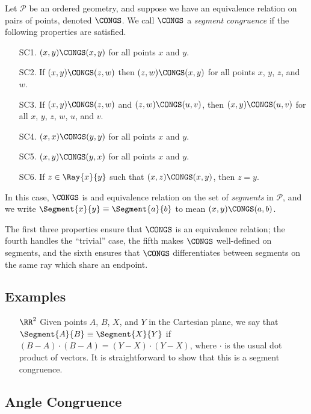\documentclass{article}
\begin{document}

\begin{dfn}
Let $\mathcal{P}$ be an ordered geometry, and suppose we have an equivalence relation on pairs of points, denoted $\CONGS$. We call $\CONGS$ a \emph{segment congruence} if the following properties are satisfied.
\begin{itemize}
\item[SC1.] $(x,y) \CONGS (x,y)$ for all points $x$ and $y$.
\item[SC2.] If $(x,y) \CONGS (z,w)$ then $(z,w) \CONGS (x,y)$ for all points $x$, $y$, $z$, and $w$.
\item[SC3.] If $(x,y) \CONGS (z,w)$ and $(z,w) \CONGS (u,v)$, then $(x,y) \CONGS (u,v)$ for all $x$, $y$, $z$, $w$, $u$, and $v$.
\item[SC4.] $(x,x) \CONGS (y,y)$ for all points $x$ and $y$.
\item[SC5.] $(x,y) \CONGS (y,x)$ for all points $x$ and $y$.
\item[SC6.] If $z \in \Ray{x}{y}$ such that $(x,z) \CONGS (x,y)$, then $z = y$.
\end{itemize}

In this case, $\CONGS$ is and equivalence relation on the set of \emph{segments} in $\mathcal{P}$, and we write $\Segment{x}{y} \equiv \Segment{a}{b}$ to mean $(x,y) \CONGS (a,b)$.
\end{dfn}

The first three properties ensure that $\CONGS$ is an equivalence relation; the fourth handles the ``trivial'' case, the fifth makes $\CONGS$ well-defined on segments, and the sixth ensures that $\CONGS$ differentiates between segments on the same ray which share an endpoint.

\subsection*{Examples}

\begin{itemize}
\item[$\RR^2$] Given points $A$, $B$, $X$, and $Y$ in the Cartesian plane, we say that $\Segment{A}{B} \equiv \Segment{X}{Y}$ if $(B-A) \cdot (B-A) = (Y-X) \cdot (Y-X)$, where $\cdot$ is the usual dot product of vectors. It is straightforward to show that this is a segment congruence.
\end{itemize}

\subsection*{Angle Congruence}
\end{document}
